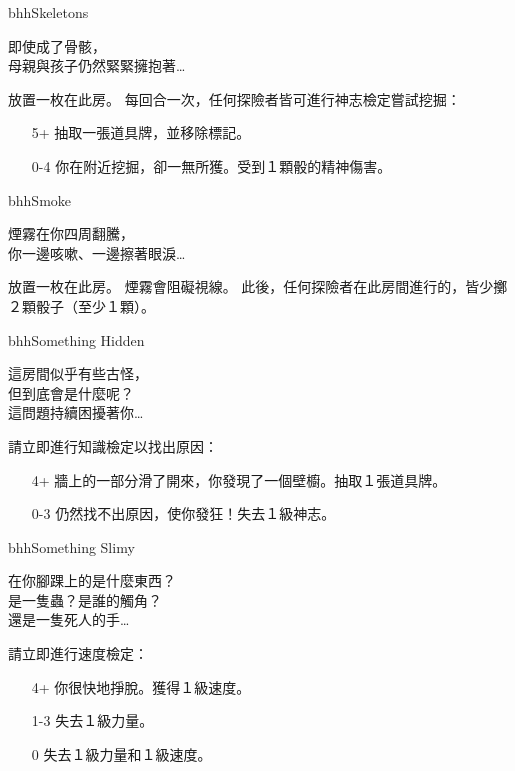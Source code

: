 \begin{EventCard}{bhh}{Skeletons}
	\begin{CardStory}
		即使成了骨骸，\\
		母親與孩子仍然緊緊擁抱著…
	\end{CardStory}
	放置一枚在此房。\smallbreak
	每回合一次，任何探險者皆可進行神志檢定嘗試挖掘：
	\begin{itemize}
		\item[5+] 抽取一張道具牌，並移除標記。
		\item[0-4] 你在附近挖掘，卻一無所獲。受到１顆骰的精神傷害。
	\end{itemize}
\end{EventCard}%
\linebreak[0]%
\begin{EventCard}{bhh}{Smoke}
	\begin{CardStory}
		煙霧在你四周翻騰，\\
		你一邊咳嗽、一邊擦著眼淚…
	\end{CardStory}
	放置一枚在此房。\smallbreak
	煙霧會阻礙視線。\smallbreak
	此後，任何探險者在此房間進行的，皆少擲２顆骰子（至少１顆）。\smallbreak
\end{EventCard}%
\linebreak[0]%
\begin{EventCard}{bhh}{Something Hidden}
	\begin{CardStory}
		這房間似乎有些古怪，\\
		但到底會是什麼呢？\\
		這問題持續困擾著你…
	\end{CardStory}
	請立即進行知識檢定以找出原因：
	\begin{itemize}
		\item[4+] 牆上的一部分滑了開來，你發現了一個壁櫥。抽取１張道具牌。
		\item[0-3] 仍然找不出原因，使你發狂！失去１級神志。
	\end{itemize}
\end{EventCard}%
\linebreak[0]%
\begin{EventCard}{bhh}{Something Slimy}
	\begin{CardStory}
		在你腳踝上的是什麼東西？\\
		是一隻蟲？是誰的觸角？\\
		還是一隻死人的手…
	\end{CardStory}
	請立即進行速度檢定：
	\begin{itemize}
		\item[4+] 你很快地掙脫。獲得１級速度。
		\item[1-3] 失去１級力量。
		\item[0] 失去１級力量和１級速度。
	\end{itemize}
\end{EventCard}%
